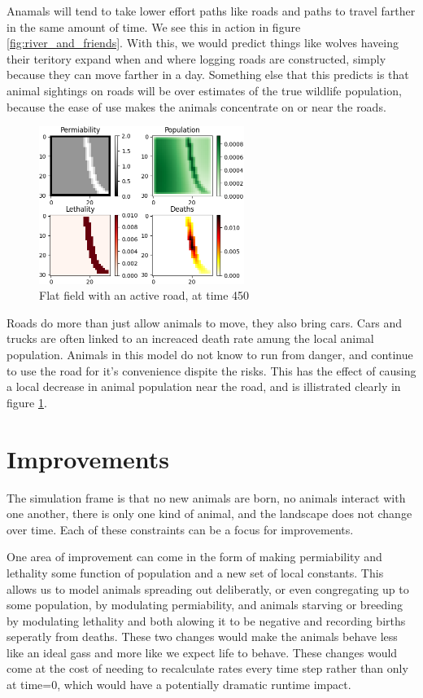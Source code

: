 \documentclass[twocolumn]{article}
\begin{document}
Anamals will tend to take lower effort paths like roads and paths to travel farther in the same amount of time. We see this in action in figure \ref{fig:river_and_friends}. With this, we would predict things like wolves haveing their teritory expand when and where logging roads are constructed, simply because they can move farther in a day. Something else that this predicts is that animal sightings on roads will be over estimates of the true wildlife population, because the ease of use makes the animals concentrate on or near the roads.

\begin{figure}[h!]
	\begin{center}
		\includegraphics[width=18em]{active_road.png}
		\caption{Flat field with an active road, at time 450}
		\label{fig:active_road}
	\end{center}
\end{figure}

Roads do more than just allow animals to move, they also bring cars. Cars and trucks are often linked to an increaced death rate amung the local animal population. Animals in this model do not know to run from danger, and continue to use the road for it's convenience dispite the risks. This has the effect of causing a local decrease in animal population near the road, and is illistrated clearly in figure \ref{fig:active_road}.
\FloatBarrier
\section{Improvements}

The simulation frame is that no new animals are born, no animals interact with one another, there is only one kind of animal, and the landscape does not change over time. Each of these constraints can be a focus for improvements.

One area of improvement can come in the form of making permiability and lethality some function of population and a new set of local constants. This allows us to model animals spreading out deliberatly, or even congregating up to some population, by modulating permiability, and animals starving or breeding by modulating lethality and both alowing it to be negative and recording births seperatly from deaths. These two changes would make the animals behave less like an ideal gass and more like we expect life to behave. These changes would come at the cost of needing to recalculate rates every time step rather than only at time=0, which would have a potentially dramatic runtime impact.
\end{document}
